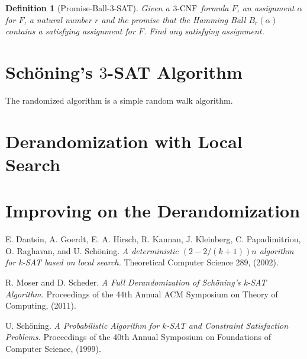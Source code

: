 \documentclass{article}
\newcommand{\SAT}{\textnormal{$3$-SAT}}
\newcommand{\CNF}{\textnormal{$3$-CNF}}
\newcommand{\ball}[2]{B_{#1}(#2)}
\newtheorem{definition}{Definition}
\begin{document}
\begin{definition}[Promise-Ball-\SAT\cite{Moser11}]
	Given a $\CNF$ formula $F$, an assignment $\alpha$ for $F$, a natural number $r$ and the promise that the Hamming Ball $\ball{r}{\alpha}$ contains a satisfying assignment for $F$. Find any satisfying assignment.
\end{definition}
\section{Sch\"{o}ning's $3$-SAT Algorithm\cite{Schoning99}}
The randomized algorithm is a simple random walk algorithm. 


\section{Derandomization with Local Search\cite{Dantsin02}}

\section{Improving on the Derandomization\cite{Moser11}}

\begin{thebibliography}{9}
E. Dantsin, A. Goerdt, E. A. Hirsch, R. Kannan, J. Kleinberg, C. Papadimitriou, O. Raghavan, and U. Sch\"{o}ning. 
\textit{A deterministic $(2-2/(k+1))n$ algorithm for k-SAT based on local search.} Theoretical Computer Science 289, (2002).

R. Moser and D. Scheder.
\textit{A Full Derandomization of Sch\"{o}ning’s k-SAT Algorithm.} Proceedings of the 44th Annual ACM Symposium on Theory of Computing, (2011).

U. Sch\"{o}ning.
\textit{A Probabilistic Algorithm for $k$-SAT and Constraint Satisfaction Problems.} Proceedings of the 40th Annual Symposium on Foundations of Computer Science, (1999).

\end{thebibliography}
\end{document}
